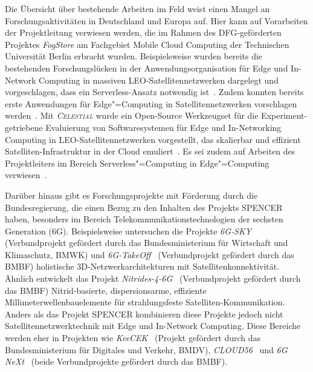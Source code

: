 Die Übersicht über bestehende Arbeiten im Feld weist einen Mangel an Forschungsaktivitäten in Deutschland und Europa auf.
Hier kann auf Vorarbeiten der Projektleitung verwiesen werden, die im Rahmen des DFG-geförderten Projektes \emph{FogStore} am Fachgebiet Mobile Cloud Computing der Technischen Universität Berlin erbracht wurden.
Beispielsweise wurden bereits die bestehenden Forschungslücken in der Anwendungsorganisation für Edge und In-Network Computing in massiven LEO-Satellitennetzwerken dargelegt und vorgeschlagen, dass ein Serverless-Ansatz notwendig ist~\cite{paper_pfandzelter2021_LEO_serverless}.
Zudem konnten bereits erste Anwendungen für Edge"=Computing in Satellitennetzwerken vorschlagen werden~\cite{paper_pfandzelter2021_LEO_CDN,pfandzelter2023mars}.
Mit \emph{\textsc{Celestial}} wurde ein Open-Source Werkzeugset für die Experiment-getriebene Evaluierung von Softwaresystemen für Edge und In-Networking Computing in LEO-Satellitennetzwerken vorgestellt, das skalierbar und effizient Satelliten-Infrastruktur in der Cloud emuliert~\cite{pfandzelter2023celestialdemo,paper_becker2022_netem,pfandzelter2023failure,paper_pfandzelter2022_celestial,techreport_pfandzelter2022_celestial_extended}.
Es sei zudem auf Arbeiten des Projektleiters im Bereich Serverless"=Computing in Edge"=Computing verwiesen~\cite{paper_pfandzelter2020_tinyfaas,pfandzelter2023fred,pfandzelter2023enoki}.

Darüber hinaus gibt es Forschungsprojekte mit Förderung durch die Bundesregierung, die einen Bezug zu den Inhalten des Projekts SPENCER haben, besonders im Bereich Telekommunikationstechnologien der sechsten Generation (6G).
Beispielsweise untersuchen die Projekte \emph{6G-SKY}~\cite{6gsky} (Verbundprojekt gefördert durch das Bundesministerium für Wirtschaft und Klimaschutz, BMWK) und \emph{6G-TakeOff}~\cite{6gtakeoff} (Verbundprojekt gefördert durch das BMBF) holistische 3D-Netzwerkarchitekturen mit Satellitenkonnektivität.
Ähnlich entwickelt das Projekt \emph{Nitrides-4-6G}~\cite{nitrides46g} (Verbundprojekt gefördert durch das BMBF) Nitrid-basierte, dispersionsarme, effiziente Millimeterwellenbauelemente für strahlungsfeste Satelliten-Kommunikation.
Anders als das Projekt SPENCER kombinieren diese Projekte jedoch nicht Satellitennetzwerktechnik mit Edge und In-Network Computing.
Diese Bereiche werden eher in Projekten wie \emph{KeeCEK}~\cite{keecek} (Projekt gefördert durch das Bundesministerium für Digitales und Verkehr, BMDV), \emph{CLOUD56}~\cite{cloud56} und \emph{6G NeXt}~\cite{6gnext} (beide Verbundprojekte gefördert durch das BMBF).


